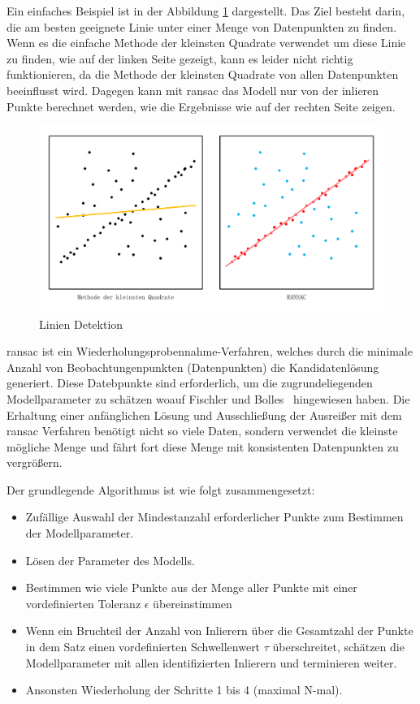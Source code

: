 Ein einfaches Beispiel ist in der Abbildung \ref{fig:Linien Detektion} dargestellt. Das Ziel besteht darin, die am besten geeignete Linie unter einer Menge von Datenpunkten zu finden. Wenn es die einfache Methode der kleinsten Quadrate verwendet um diese Linie zu finden, wie auf der linken Seite gezeigt, kann es leider nicht richtig funktionieren, da die Methode der kleinsten Quadrate von allen Datenpunkten beeinflusst wird. Dagegen kann mit \gls{ransac} das Modell nur von der inlieren Punkte berechnet werden, wie die Ergebnisse wie auf der rechten Seite zeigen. 

\begin{figure}[H]
 \centering 
 \includegraphics[keepaspectratio,width=1.0\textwidth]{images/3_Ersteverfahren/RANSAC/Linien_Detektion.pdf}
 \caption{Linien Detektion}
 \label{fig:Linien Detektion}
\end{figure} 

\gls{ransac} ist ein Wiederholungsprobennahme-Verfahren, welches durch die minimale Anzahl von Beobachtungenpunkten (Datenpunkten) die Kandidatenlösung generiert. Diese Datebpunkte sind erforderlich, um die zugrundeliegenden Modellparameter zu schätzen woauf Fischler und Bolles~\cite{ransac1} hingewiesen haben. Die Erhaltung einer anfänglichen Lösung und Ausschließung der Ausreißer mit dem \gls{ransac} Verfahren benötigt nicht so viele Daten, sondern verwendet die kleinste mögliche Menge und fährt fort diese Menge mit konsistenten Datenpunkten zu vergrößern.

Der grundlegende Algorithmus ist wie folgt zusammengesetzt:

\begin{itemize}
	\item Zufällige Auswahl der Mindestanzahl erforderlicher Punkte zum Bestimmen der Modellparameter.
	\item Lösen der Parameter des Modells.
	\item Bestimmen wie viele Punkte aus der Menge aller Punkte mit einer vordefinierten Toleranz $\epsilon$ übereinstimmen
	\item Wenn ein Bruchteil der Anzahl von Inlierern über die Gesamtzahl der Punkte in dem Satz einen vordefinierten Schwellenwert $\tau$ überschreitet, schätzen die Modellparameter mit allen identifizierten Inlierern und terminieren weiter.
	\item Ansonsten Wiederholung der Schritte 1 bis 4 (maximal N-mal).
\end{itemize}

